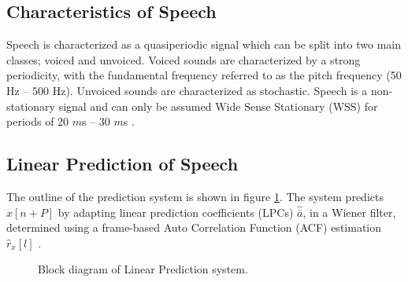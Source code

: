 \subsection{Characteristics of Speech}
Speech is characterized as a quasiperiodic signal which can be split into two main classes; voiced and unvoiced. Voiced sounds are characterized by a strong periodicity, with the fundamental frequency referred to as the pitch frequency (50 Hz -- 500 Hz). Unvoiced sounds are characterized as stochastic. Speech is a non-stationary signal and can only be assumed Wide Sense Stationary (WSS) for periods of 20 $m$s -- 30 $m$s \cite{Speech}. 

\subsection{Linear Prediction of Speech}
The outline of the prediction system is shown in figure \ref{fig:LinearPredictionOverview}. The system predicts $\hat{x}[n+P]$ by adapting linear prediction coefficients (LPCs) $\hat{\bar{a}}$, in a Wiener filter, determined using a frame-based Auto Correlation Function (ACF) estimation $\hat{r}_x[l]$ \cite{LinearPrediction}.   

\begin{figure}[H]
	\centering
	
	\caption{Block diagram of Linear Prediction system.}
	\label{fig:LinearPredictionOverview}
\end{figure}


